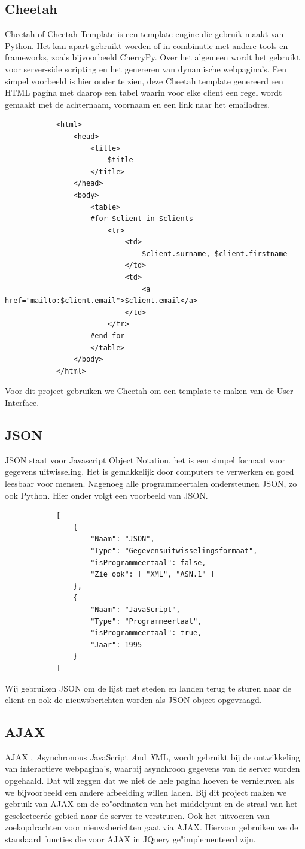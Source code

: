 \documentclass[twoside,openright]{uva-bachelor-thesis}
\begin{document}
		\subsection{Cheetah}
			Cheetah \cite{Cheetah} of Cheetah Template is een template engine die gebruik maakt van Python. Het kan apart gebruikt worden of in combinatie met andere tools en frameworks, zoals bijvoorbeeld CherryPy. Over het algemeen wordt het gebruikt voor server-side scripting en het genereren van dynamische webpagina's. Een simpel voorbeeld is hier onder te zien, deze Cheetah template genereerd een HTML pagina met daarop een tabel waarin voor elke client een regel wordt gemaakt met de achternaam, voornaam en een link naar het emailadres.
			\begin{verbatim}
			<html>
			    <head>
			        <title>
			            $title
			        </title>
			    </head>
			    <body>
			        <table>
			        #for $client in $clients
			            <tr>
			                <td>
			                    $client.surname, $client.firstname
			                </td>
			                <td>
			                    <a href="mailto:$client.email">$client.email</a>
			                </td>
			            </tr>
			        #end for
			        </table>
			    </body>
			</html>
			\end{verbatim}
			Voor dit project gebruiken we Cheetah om een template te maken van de User Interface.
		\subsection{JSON}
			JSON \cite{JSON} staat voor Javascript Object Notation, het is een simpel formaat voor gegevens uitwisseling. Het is gemakkelijk door computers te verwerken en goed leesbaar voor mensen. Nagenoeg alle programmeertalen ondersteunen JSON, zo ook Python. Hier onder volgt een voorbeeld van JSON.
			\begin{verbatim}
			[
			    { 
			        "Naam": "JSON",
			        "Type": "Gegevensuitwisselingsformaat",
			        "isProgrammeertaal": false,
			        "Zie ook": [ "XML", "ASN.1" ] 
			    },
			    { 
			        "Naam": "JavaScript",
			        "Type": "Programmeertaal",
			        "isProgrammeertaal": true,
			        "Jaar": 1995 
			    } 
			]
			\end{verbatim}
			Wij gebruiken JSON om de lijst met steden en landen terug te sturen naar de client en ook de nieuwsberichten worden als JSON object opgevraagd. 
		\subsection{AJAX}
			AJAX \cite{AJAX}, \textit{A}synchronous \textit{J}avaScript \textit{A}nd \textit{X}ML, wordt gebruikt bij de ontwikkeling van interactieve webpagina's, waarbij asynchroon gegevens van de server worden opgehaald. Dat wil zeggen dat we niet de hele pagina hoeven te vernieuwen als we bijvoorbeeld een andere afbeelding willen laden. Bij dit project maken we gebruik van AJAX om de co"ordinaten van het middelpunt en de straal van het geselecteerde gebied naar de server te verstruren. Ook het uitvoeren van zoekopdrachten voor nieuwsberichten gaat via AJAX. Hiervoor gebruiken we de standaard functies die voor AJAX in JQuery \cite{JQuery} ge"implementeerd zijn.
\end{document}
